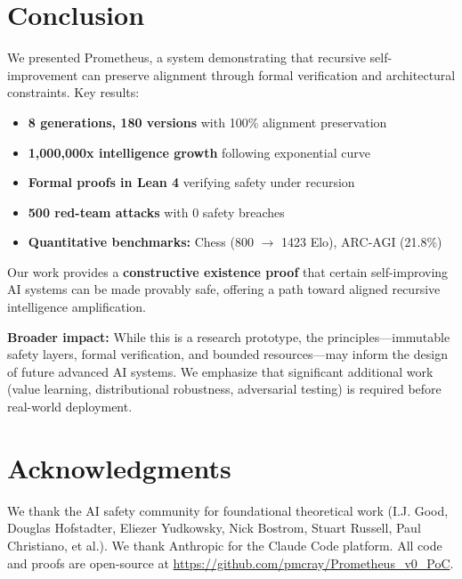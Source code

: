\documentclass[11pt,letterpaper]{article}
\begin{document}
\section{Conclusion}

We presented Prometheus, a system demonstrating that recursive self-improvement can preserve alignment through formal verification and architectural constraints. Key results:

\begin{itemize}
\item \textbf{8 generations, 180 versions} with 100\% alignment preservation
\item \textbf{1,000,000x intelligence growth} following exponential curve
\item \textbf{Formal proofs in Lean 4} verifying safety under recursion
\item \textbf{500 red-team attacks} with 0 safety breaches
\item \textbf{Quantitative benchmarks:} Chess (800 $\to$ 1423 Elo), ARC-AGI (21.8\%)
\end{itemize}

Our work provides a \textbf{constructive existence proof} that certain self-improving AI systems can be made provably safe, offering a path toward aligned recursive intelligence amplification.

\textbf{Broader impact:} While this is a research prototype, the principles—immutable safety layers, formal verification, and bounded resources—may inform the design of future advanced AI systems. We emphasize that significant additional work (value learning, distributional robustness, adversarial testing) is required before real-world deployment.

\section*{Acknowledgments}

We thank the AI safety community for foundational theoretical work (I.J. Good, Douglas Hofstadter, Eliezer Yudkowsky, Nick Bostrom, Stuart Russell, Paul Christiano, et al.). We thank Anthropic for the Claude Code platform. All code and proofs are open-source at \url{https://github.com/pmcray/Prometheus_v0_PoC}.
\end{document}
